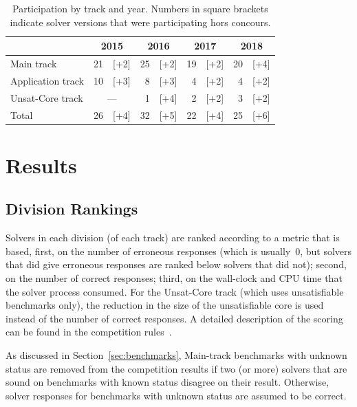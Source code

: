 \documentclass[dvipsnames,table,twoside,11pt]{article}
\begin{document}
\begin{table}
  \caption{Participation by track and year.  Numbers in square
    brackets indicate solver versions that were participating hors
    concours.}
  \label{table:participation-by-track}
  \centering
  \begin{tabular}{lr@{\,\,}rr@{\,\,}rr@{\,\,}rr@{\,\,}r}
    \toprule
                      & \multicolumn{2}{c}{2015} & \multicolumn{2}{c}{2016} & \multicolumn{2}{c}{2017} & \multicolumn{2}{c}{2018} \\
    \midrule
    Main track        & 21 &               [+2] & 25 & [+2] & 19 & [+2] & 20 & [+4] \\
    Application track & 10 &               [+3] &  8 & [+3] &  4 & [+2] &  4 & [+2] \\
    Unsat-Core track  & \multicolumn{2}{c}{---} &  1 & [+4] &  2 & [+2] &  3 & [+2] \\
    \midrule
    Total             & 26 &               [+4] & 32 & [+5] & 22 & [+4] & 25 & [+6] \\
    \bottomrule
  \end{tabular}
\end{table}


\section{Results}
\label{sec:results}

\subsection{Division Rankings}
\label{sec:division-rankings}

Solvers in each division (of each track) are ranked according to a
metric that is based, first, on the number of erroneous responses
(which is usually~0, but solvers that did give erroneous responses are
ranked below solvers that did not); second, on the number of correct
responses; third, on the wall-clock and CPU time that the solver
process consumed.  For the Unsat-Core track (which uses unsatisfiable
benchmarks only), the reduction in the size of the unsatisfiable core
is used instead of the number of correct responses.  A detailed
description of the scoring can be found in the competition
rules~\cite{rules18}.

As discussed in Section~\ref{sec:benchmarks}, Main-track benchmarks
with unknown status are removed from the competition results if two
(or more) solvers that are sound on benchmarks with known status
disagree on their result.  Otherwise, solver responses for benchmarks
with unknown status are assumed to be correct.
\end{document}
